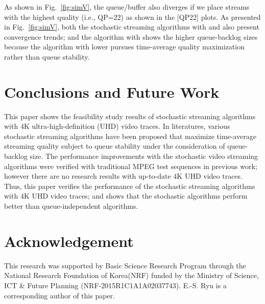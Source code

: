 \documentclass[conference]{IEEEtran}
\begin{document}
As shown in Fig.~\ref{fig:simV},
    the queue/buffer also diverges if we place streams with the highest quality (i.e., QP=22) as shown in the \textsf{[QP22]} plots.
As presented in Fig.~\ref{fig:simV},
    both the stochastic streaming algorithms with  and  also present convergence trends; and the algorithm with  shows the higher queue-backlog sizes because the algorithm with lower  pursues time-average quality maximization rather than queue stability.

\section{Conclusions and Future Work}\label{sec:4}
This paper shows the feasibility study results of stochastic streaming algorithms with 4K ultra-high-definition (UHD) video traces.
In literatures, various stochastic streaming algorithms have been proposed that maximize time-average streaming quality subject to queue stability under the consideration of queue-backlog size.
The performance improvements with the stochastic video streaming algorithms were verified with traditional MPEG test sequences in previous work; however there are no research results with up-to-date 4K UHD video traces.
Thus, this paper verifies the performance of the stochastic streaming algorithms with 4K UHD video traces; and shows that the stochastic algorithms perform better than queue-independent algorithms.


\section*{Acknowledgement}
This research was supported by Basic Science Research Program through the National Research Foundation of Korea(NRF) funded by the Ministry of Science, ICT \& Future Planning (NRF-2015R1C1A1A02037743).
E.-S. Ryu is a corresponding author of this paper.
\end{document}
